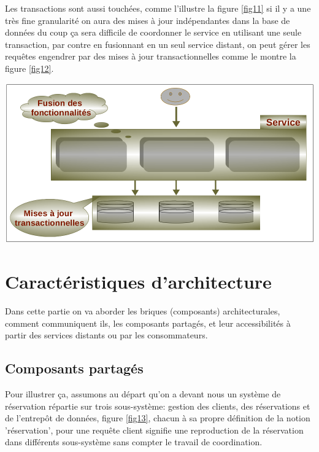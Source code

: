 \documentclass[12pt, a4paper, openany]{report}
\begin{document}
   Les transactions sont aussi touchées, comme l'illustre la figure \ref{fig11} si il y a une très fine granularité on aura des mises à jour indépendantes dans la base de données du coup ça sera difficile de coordonner le service en utilisant une seule transaction, par contre en fusionnant en un seul service distant, on peut gérer les requêtes engendrer par des mises à jour transactionnelles comme le montre la figure \ref{fig12}.
   
   \begin{center}
     \includegraphics[scale=0.33]{impact_transac_12.png}
     \label{fig12}
   \end{center}
   
 \section{Caractéristiques d'architecture}
 
  Dans cette partie on va aborder les briques (composants) architecturales, comment communiquent ils, les composants partagés, et leur accessibilités à partir des services distants ou par les consommateurs.\\
  
   \subsection{Composants partagés}
    Pour illustrer ça, assumons au départ qu'on a devant nous un système de réservation répartie sur trois sous-système: gestion des clients, des réservations et de l'entrepôt de données, figure \ref{fig13}, chacun à sa propre définition de la notion 'réservation', pour une requête client signifie une reproduction de la réservation dans différents sous-système sans compter le travail de coordination.
\end{document}

